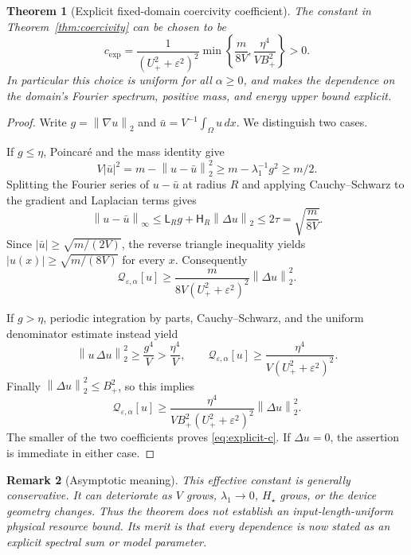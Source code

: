 \documentclass[11pt]{article}
\newtheorem{theorem}{Theorem}[section]
\newtheorem{remark}[theorem]{Remark}
\newcommand{\dd}{\,dx}
\newcommand{\norm}[1]{\left\|#1\right\|}
\begin{document}
\begin{theorem}[Explicit fixed-domain coercivity coefficient]
\label{thm:explicit}
The constant in Theorem~\ref{thm:coercivity} can be chosen to be
\begin{equation}
\label{eq:explicit-c}
\boxed{\quad
c_{\mathrm{exp}}=
\frac{1}{(U_+^2+\varepsilon^2)^2}
\min\left\{\frac{m}{8V},
\frac{\eta^4}{VB_+^2}\right\}>0.\quad}
\end{equation}
In particular this choice is uniform for \emph{all}
\(\alpha\ge0\), and makes the dependence on the domain's Fourier
spectrum, positive mass, and energy upper bound explicit.
\end{theorem}
\begin{proof}
Write \(g=\norm{\nabla u}_2\) and \(\bar u=V^{-1}\int_\Omega u\dd\).
We distinguish two cases.

If \(g\le\eta\), Poincar\'e and the mass identity give
\[
V|\bar u|^2=m-\norm{u-\bar u}_2^2
\ge m-\lambda_1^{-1}g^2\ge m/2.
\]
Splitting the Fourier series of \(u-\bar u\) at radius \(R\)
and applying Cauchy--Schwarz to the gradient and Laplacian terms gives
\[
\norm{u-\bar u}_\infty
\le \mathsf L_R g+\mathsf H_R\norm{\Delta u}_2
\le2\tau=\sqrt{\frac{m}{8V}}.
\]
Since \(|\bar u|\ge\sqrt{m/(2V)}\),
the reverse triangle inequality yields
\(|u(x)|\ge\sqrt{m/(8V)}\) for every \(x\).
Consequently
\[
\mathcal Q_{\varepsilon,\alpha}[u]
\ge\frac{m}{8V(U_+^2+\varepsilon^2)^2}
     \norm{\Delta u}_2^2.
\]

If \(g>\eta\), periodic integration by parts, Cauchy--Schwarz,
and the uniform denominator estimate instead yield
\[
\norm{u\,\Delta u}_2^2\ge\frac{g^4}{V}
>\frac{\eta^4}{V},
\qquad
\mathcal Q_{\varepsilon,\alpha}[u]
\ge\frac{\eta^4}{V(U_+^2+\varepsilon^2)^2}.
\]
Finally \(\norm{\Delta u}_2^2\le B_+^2\), so this implies
\[
\mathcal Q_{\varepsilon,\alpha}[u]
\ge\frac{\eta^4}{VB_+^2(U_+^2+\varepsilon^2)^2}
\norm{\Delta u}_2^2.
\]
The smaller of the two coefficients proves
\eqref{eq:explicit-c}. If \(\Delta u=0\), the assertion is
immediate in either case.
\end{proof}

\begin{remark}[Asymptotic meaning]
This effective constant is generally conservative. It can deteriorate
as \(V\) grows, \(\lambda_1\to0\), \(H_\star\) grows, or the device
geometry changes. Thus the theorem does \emph{not} establish an
input-length-uniform physical resource bound. Its merit is that every
dependence is now stated as an explicit spectral sum or model parameter.
\end{remark}
\end{document}
